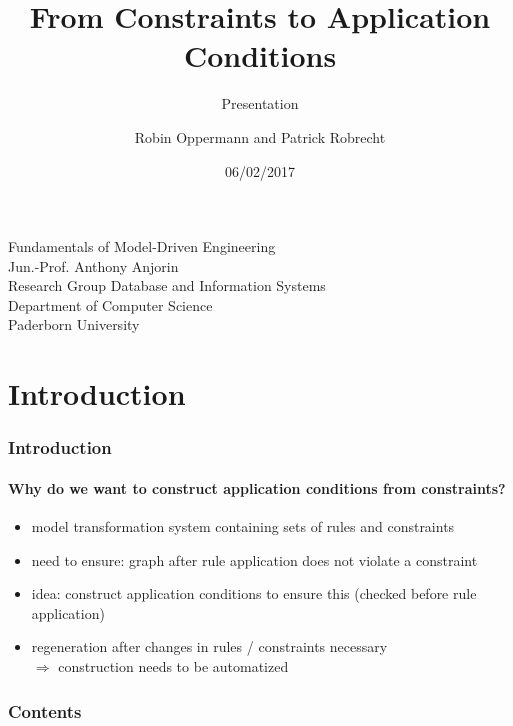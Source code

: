 \documentclass[32pt,t]{beamer}
\begin{document}
	\title{From Constraints to Application Conditions}
	\subtitle{Presentation}
	\date{06/02/2017}
	\author{Robin Oppermann and Patrick Robrecht}
	
	\begin{frame}
		\titlepage
		
		\begin{center}
			Fundamentals of Model-Driven Engineering \\
			Jun.-Prof. Anthony Anjorin \\
			Research Group Database and Information Systems \\
			Department of Computer Science \\
			Paderborn University
		\end{center}
	\end{frame}

\section{Introduction}
	\begin{frame}
		\frametitle{Introduction}
		\framesubtitle{Why do we want to construct application conditions from constraints?}		
		\begin{itemize}
			\item model transformation system containing sets of rules and constraints
			\item need to ensure: graph after rule application does not violate a constraint
			\item idea: construct application conditions to ensure this (checked before rule application)
			\item regeneration after changes in rules / constraints necessary \\
				$\Rightarrow$ construction needs to be automatized 
		\end{itemize}
	\end{frame}

	\begin{frame}
		\frametitle{Contents}
		\tableofcontents
	\end{frame}

%	
\end{document}
